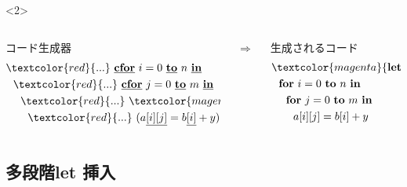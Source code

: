 \documentclass[dvipdfmx,cjk,xcolor=dvipsnames,envcountsect,notheorems,12pt]{beamer}
\newcommand\cLet{\underline{\textbf{clet}}}
\newcommand\cIn{\underline{\textbf{in}}}
\newcommand\red[1]{\textcolor{red}{#1}}
\newcommand\magenta[1]{\textcolor{magenta}{#1}}
\newcommand\forin[2]{\textbf{for}~{#1}~\textbf{to}~{#2}~\textbf{in}}
\newcommand\cforin[2]{\underline{\textbf{cfor}}~{#1}~\underline{\textbf{to}}~{#2}~\underline{\textbf{in}}}
\newcommand\Let{\textbf{let}}
\newcommand\In{\textbf{in}}
\newcommand\cArray[1]{\underline{[{#1}]}}
\newcommand\cArrays[2]{\underline{[{#1}][{#2}]}}
\theoremstyle{definition}
\begin{document}
\begin{frame}
  \begin{onlyenv}<2>
    \begin{columns}
      \begin{column}{0.5\textwidth}%
        コード生成器
        \begin{align*}
          & \red{...}~ \cforin{i = 0}{n} \\
          & ~~\red{...}~ \cforin{j = 0}{m} \\
          & ~~~~\red{...}~ \magenta{\cLet~y=t~\cIn} \\
          & ~~~~~~\red{...}~ (a\cArrays{i}{j} = b\cArray{i} + y)
        \end{align*}
      \end{column}
      $\Rightarrow$
      \begin{column}{0.5\textwidth}%
        生成されるコード
        \begin{align*}
          & \magenta{\Let ~y ~= ~t ~\In} \\
          & ~~\forin{i = 0}{n} \\
          & ~~~~\forin{j = 0}{m} \\
          & ~~~~~~a[i][j] = b[i] + y \\
        \end{align*}
      \end{column}
    \end{columns}
  \end{onlyenv}
\end{frame}



\subsection{多段階let 挿入}
\end{document}
